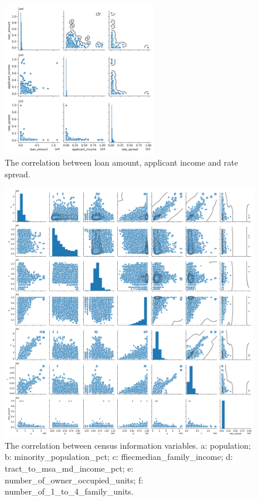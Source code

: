 \documentclass[a4paper,10pt,notitlepage]{article}
\begin{document}
\begin{figure}[H]
\centering
\includegraphics[width=0.6\textwidth]{hmda_pairwise_1_rate.png}
\caption{The correlation between loan amount, applicant income and rate spread.}
\label{fig:cor1}
\end{figure}

\begin{figure}[H]
\centering
\includegraphics[width=1.0\textwidth]{hmda_pairwise_2_rate.png}
\caption{The correlation between census information variables.
a: population; b: minority\_population\_pct; c: ffiecmedian\_family\_income; 
d: tract\_to\_msa\_md\_income\_pct; e: number\_of\_owner\_occupied\_units; f: number\_of\_1\_to\_4\_family\_units.
}
\label{fig:cor2}
\end{figure}
\end{document}
